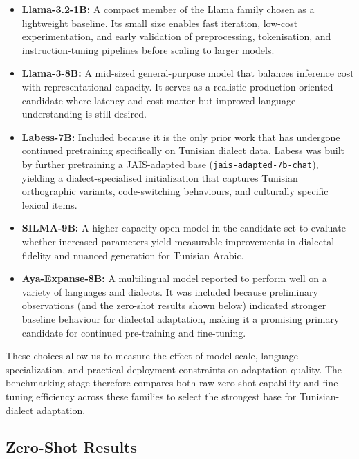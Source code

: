 \documentclass[12pt,a4paper]{report}
\begin{document}
\begin{itemize}
    \item \textbf{Llama-3.2-1B:} A compact member of the Llama family chosen as a
        lightweight baseline. Its small size enables fast iteration, low-cost
        experimentation, and early validation of preprocessing, tokenisation, and
        instruction-tuning pipelines before scaling to larger models.

    \item \textbf{Llama-3-8B:} A mid-sized general-purpose model that balances
        inference cost with representational capacity. It serves as a realistic
        production-oriented candidate where latency and cost matter but improved
        language understanding is still desired.

    \item \textbf{Labess-7B:} Included because it is the only prior work that has
        undergone continued pretraining specifically on Tunisian dialect data. Labess
        was built by further pretraining a JAIS-adapted base (\texttt{jais-adapted-7b-chat}),
        yielding a dialect-specialised initialization that captures Tunisian orthographic
        variants, code-switching behaviours, and culturally specific lexical items. 
        
    \item \textbf{SILMA-9B:} A higher-capacity open model in the candidate set to
        evaluate whether increased parameters yield measurable improvements in
        dialectal fidelity and nuanced generation for Tunisian Arabic.

    \item \textbf{Aya-Expanse-8B:} A multilingual model reported to perform well on
        a variety of languages and dialects. It was included because preliminary
        observations (and the zero-shot results shown below) indicated stronger
        baseline behaviour for dialectal adaptation, making it a promising primary
        candidate for continued pre-training and fine-tuning.
\end{itemize}

These choices allow us to measure the effect of model scale, language specialization,
and practical deployment constraints on adaptation quality. The benchmarking stage
therefore compares both raw zero-shot capability and fine-tuning efficiency across
these families to select the strongest base for Tunisian-dialect adaptation.

\subsection{Zero-Shot Results}
\end{document}

